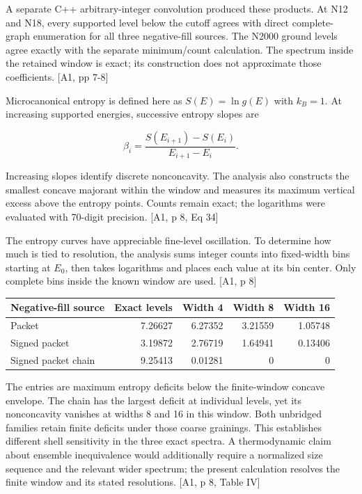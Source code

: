 A separate C++ arbitrary-integer convolution produced these products. At N12 and N18, every supported level below the cutoff agrees with direct complete-graph enumeration for all three negative-fill sources. The N2000 ground levels agree exactly with the separate minimum/count calculation. The spectrum inside the retained window is exact; its construction does not approximate those coefficients. {[}A1, pp 7-8{]}

Microcanonical entropy is defined here as \(S(E)=\ln g(E)\) with \(k_B=1\). At increasing supported energies, successive entropy slopes are

\[\beta_i=\frac{S(E_{i+1})-S(E_i)}{E_{i+1}-E_i}.\]

Increasing slopes identify discrete nonconcavity. The analysis also constructs the smallest concave majorant within the window and measures its maximum vertical excess above the entropy points. Counts remain exact; the logarithms were evaluated with 70-digit precision. {[}A1, p 8, Eq 34{]}

The entropy curves have appreciable fine-level oscillation. To determine how much is tied to resolution, the analysis sums integer counts into fixed-width bins starting at \(E_0\), then takes logarithms and places each value at its bin center. Only complete bins inside the known window are used. {[}A1, p 8{]}

\begin{longtable}[]{@{}lrrrr@{}}
\toprule\noalign{}
Negative-fill source & Exact levels & Width 4 & Width 8 & Width 16 \\
\midrule\noalign{}
\endhead
\bottomrule\noalign{}
\endlastfoot
Packet & 7.26627 & 6.27352 & 3.21559 & 1.05748 \\
Signed packet & 3.19872 & 2.76719 & 1.64941 & 0.13406 \\
Signed packet chain & 9.25413 & 0.01281 & 0 & 0 \\
\end{longtable}

The entries are maximum entropy deficits below the finite-window concave envelope. The chain has the largest deficit at individual levels, yet its nonconcavity vanishes at widths 8 and 16 in this window. Both unbridged families retain finite deficits under those coarse grainings. This establishes different shell sensitivity in the three exact spectra. A thermodynamic claim about ensemble inequivalence would additionally require a normalized size sequence and the relevant wider spectrum; the present calculation resolves the finite window and its stated resolutions. {[}A1, p 8, Table IV{]}

